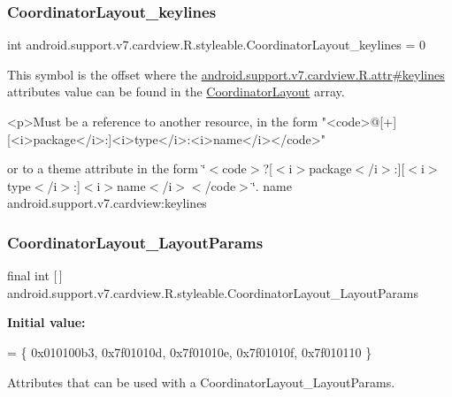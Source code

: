 \subsubsection{\texorpdfstring{Coordinator\+Layout\+\_\+keylines}{CoordinatorLayout\_keylines}}
{\footnotesize\ttfamily int android.\+support.\+v7.\+cardview.\+R.\+styleable.\+Coordinator\+Layout\+\_\+keylines = 0\hspace{0.3cm}{\ttfamily [static]}}

This symbol is the offset where the \hyperlink{classandroid_1_1support_1_1v7_1_1cardview_1_1R_1_1attr_ac25bc2cb240f07022d238edbb304cc92}{android.\+support.\+v7.\+cardview.\+R.\+attr\#keylines} attribute\textquotesingle{}s value can be found in the \hyperlink{classandroid_1_1support_1_1v7_1_1cardview_1_1R_1_1styleable_af6588adcd8d900f07f32f7bc3055e04d}{Coordinator\+Layout} array.

\begin{DoxyVerb}      <p>Must be a reference to another resource, in the form "<code>@[+][<i>package</i>:]<i>type</i>:<i>name</i></code>"
\end{DoxyVerb}
 or to a theme attribute in the form \char`\"{}$<$code$>$?\mbox{[}$<$i$>$package$<$/i$>$\+:\mbox{]}\mbox{[}$<$i$>$type$<$/i$>$\+:\mbox{]}$<$i$>$name$<$/i$>$$<$/code$>$\char`\"{}.  name android.\+support.\+v7.\+cardview\+:keylines \mbox{\label{classandroid_1_1support_1_1v7_1_1cardview_1_1R_1_1styleable_afac1c5752b8eb35d30db48df7a9eea89}} 
\subsubsection{\texorpdfstring{Coordinator\+Layout\+\_\+\+Layout\+Params}{CoordinatorLayout\_LayoutParams}}
{\footnotesize\ttfamily final int \mbox{[}$\,$\mbox{]} android.\+support.\+v7.\+cardview.\+R.\+styleable.\+Coordinator\+Layout\+\_\+\+Layout\+Params\hspace{0.3cm}{\ttfamily [static]}}

{\bfseries Initial value\+:}
\begin{DoxyCode}
= \{
            0x010100b3, 0x7f01010d, 0x7f01010e, 0x7f01010f,
            0x7f010110
        \}
\end{DoxyCode}
Attributes that can be used with a Coordinator\+Layout\+\_\+\+Layout\+Params. 

